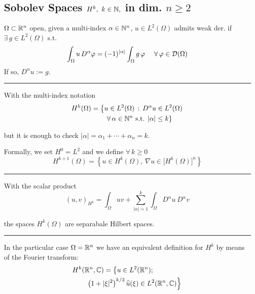 \subsection{\texorpdfstring{\color{red}Sobolev Spaces \texorpdfstring{$H^k,\ k\in\mathbb{N},$}{C} in dim. \texorpdfstring{$n\geq 2$}{C}}{}}


$\Omega\subset \mathbb{R}^n$ open, given a multi-index $\alpha\in \mathbb{N}^n$, $u\in L^2(\Omega)$ admits weak der. if $\exists\,g\in L^2(\Omega)$ s.t.
\begin{equation*}
\int_\Omega u\,D^\alpha\varphi=(-1)^{|\alpha|}\int_\Omega g\,\varphi\quad\ \forall\, \varphi\in \mathcal{D}(\Omega)
\end{equation*}
If so, $D^\alpha u :=g$.

\rule{0.31\textwidth}{0.2pt}

With the multi-index notation
\begin{align*}
H^k(\Omega) &= \left\{ u\in L^2(\Omega)\,:\,D^\alpha u\in L^2(\Omega) \right. \\
&\qquad \left. \forall\,\alpha\in\mathbb{N}^n\text{ s.t. }|\alpha|\leq k \right\}
\end{align*}

but it is enough to check $|\alpha|=\alpha_1+\cdots+\alpha_n=k$.

\smallskip

Formally, we set $H^0=L^2$ and we define $\forall\, k\geq 0$
\begin{equation*}
H^{k+1}(\Omega)=\left\{ u\in H^k(\Omega),\ \nabla u \in \big[H^k(\Omega)\big]^n \right\}
\end{equation*}

\rule{0.31\textwidth}{0.2pt}
\smallskip

With the scalar product
\begin{equation*}
(u,v)_{H^k}=\int_\Omega uv+\sum_{|\alpha|=1}^k \int_\Omega D^\alpha u\ D^\alpha v
\end{equation*}

the spaces $H^k(\Omega)$ are separabale Hilbert spaces.

\rule{0.31\textwidth}{0.2pt}
\smallskip

In the particular case $\Omega=\mathbb{R}^n$ we have an equivalent definition for $H^k$ by means of the Fourier transform:
\begin{gather*}
H^k(\mathbb{R}^n,\mathbb{C})= \left\{ u\in L^2(\mathbb{R}^n); \right. \qquad\qquad \\
\qquad \left. \left( 1+ | \xi |^2 \right)^{k/2}\widehat{u}(\xi)\in L^2(\mathbb{R}^n,\mathbb{C}) \right\}
\end{gather*}

